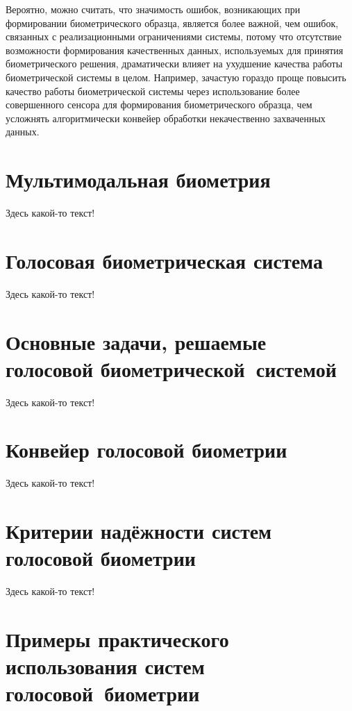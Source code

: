 \documentclass[12pt]{book}
\begin{document}
{\begin{itemize}[topsep=1pt]
\end{itemize}

Вероятно, можно считать, что значимость ошибок, возникающих при формировании биометрического образца, является более важной, чем ошибок, связанных с реализационными ограничениями системы, потому что отсутствие возможности формирования качественных данных, используемых для принятия биометрического решения, драматически влияет на ухудшение качества работы биометрической системы в целом. Например, зачастую гораздо проще повысить качество работы биометрической системы через использование более совершенного сенсора для формирования биометрического образца, чем усложнять алгоритмически конвейер обработки некачественно захваченных данных.

}

\section{Мультимодальная биометрия}

\large{Здесь какой-то текст!}

\section{Голосовая биометрическая система}

\large{Здесь какой-то текст!}

\section{Основные задачи, решаемые голосовой биометрической~системой}

\large{Здесь какой-то текст!}

\section{Конвейер голосовой биометрии}

\large{Здесь какой-то текст!}

\section{Критерии надёжности систем голосовой биометрии}

\large{Здесь какой-то текст!}

\section{Примеры практического использования систем голосовой~биометрии}
\end{document}
